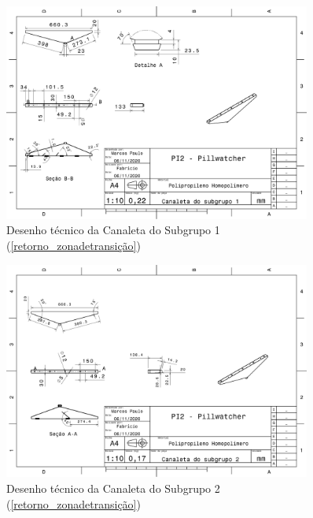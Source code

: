 \begin{apendicesenv}
\begin{figure}[H]
    \centering
    \includegraphics[width=0.9\textwidth]{figuras/estrutura/Desenhos/Canaleta_S1.pdf}
    \caption{Desenho técnico da Canaleta do Subgrupo 1 (\ref{retorno_zonadetransição})}
    \label{fig:canaletaS1}
\end{figure}

\begin{figure}[H]
    \centering
    \includegraphics[width=0.9\textwidth]{figuras/estrutura/Desenhos/Canaleta_S2.pdf}
    \caption{Desenho técnico da Canaleta do Subgrupo 2 (\ref{retorno_zonadetransição})}
    \label{fig:canaletaS2}
\end{figure}


\end{apendicesenv}
